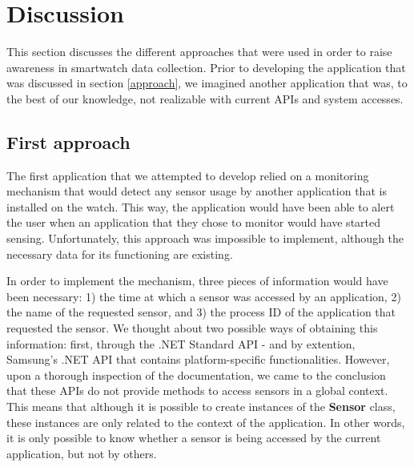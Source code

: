 \documentclass[conference, a4paper, 10pt, twocolumn]{IEEEtran}
\begin{document}
\section{\textbf{Discussion}}\label{discussion}
This section discusses the different approaches that were used in order to raise awareness in smartwatch data collection. Prior to developing the application that was discussed in section \ref{approach}, we imagined another application that was, to the best of our knowledge, not realizable with current \acp{API} and system accesses.  

\subsection{\textbf{First approach}}
The first application that we attempted to develop relied on a monitoring mechanism that would detect any sensor usage by another application that is installed on the watch. This way, the application would have been able to alert the user when an application that they chose to monitor would have started sensing. Unfortunately, this approach was impossible to implement, although the necessary data for its functioning are existing.

In order to implement the mechanism, three pieces of information would have been necessary: 1) the time at which a sensor was accessed by an application, 2) the name of the requested sensor, and 3) the process ID of the application that requested the sensor. We thought about two possible ways of obtaining this information: first, through the .NET Standard \ac{API} - and by extention, Samsung's .NET \ac{API} that contains platform-specific functionalities\cite{tizen}. However, upon a thorough inspection of the documentation, we came to the conclusion that these \acp{API} do not provide methods to access sensors in a global context. This means that although it is possible to create instances of the \textbf{Sensor} class, these instances are only related to the context of the application. In other words, it is only possible to know whether a sensor is being accessed by the current application, but not by others. 
\end{document}
